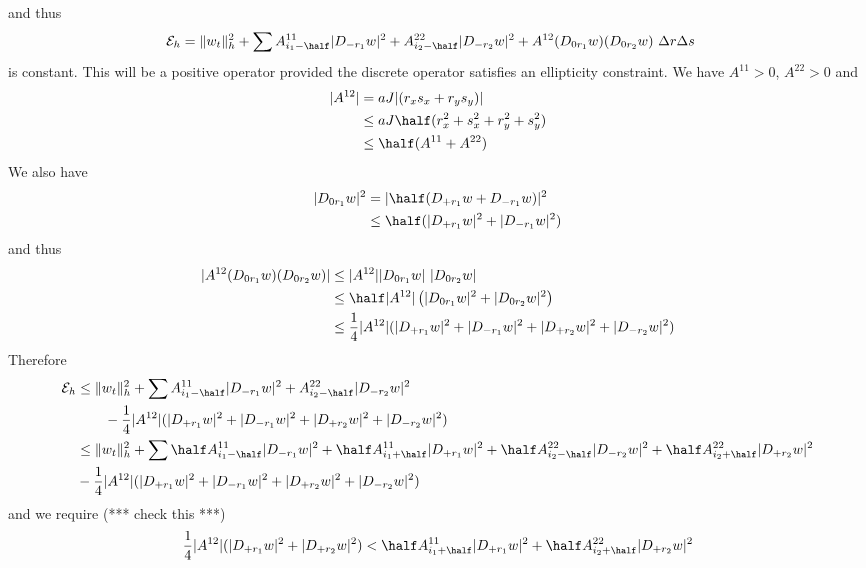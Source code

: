 \documentclass[10pt]{article}
\begin{document}
and thus
\begin{align*}
  {\cal E}_h &= \| w_t \|_h^2 + \sum A^{11}_{i_1-\half} |D_{- r_1} w|^2
                      +A^{22}_{i_2-\half} |D_{- r_2} w|^2
                      +A^{12} (D_{0 r_1} w)(D_{0 r_2} w) ~\Delta r \Delta s
\end{align*}
is constant. This will be a positive operator provided the discrete operator satisfies an ellipticity
constraint.
We have $A^{11}>0$, $A^{22}>0$ and
\begin{align*}
   | A^{12}| &= a J |(r_x s_x + r_y s_y)| \\
          &\le a J \half( r_x^2 + s_x^2 + r_y^2 + s_y^2 ) \\
          &\le \half( A^{11} + A^{22} )
\end{align*}
We also have
\begin{align*}
  | D_{0 r_1} w |^2 &= | \half( D_{+ r_1}w+ D_{- r_1}w) |^2 \\
                    &\le \half( |D_{+ r_1}w|^2 + |D_{- r_1}w |^2  )
\end{align*}
and thus
\begin{align*}
    | A^{12} (D_{0 r_1} w)(D_{0 r_2} w) | & \le | A^{12} | |D_{0 r_1} w| ~ |D_{0 r_2} w| \\
                         &\le {\half} | A^{12} |\left( |D_{0 r_1} w|^2 + |D_{0 r_2} w|^2 \right) \\
    &\le {1\over 4} |A^{12}|( |D_{+ r_1}w|^2 + |D_{- r_1}w |^2  + |D_{+ r_2}w|^2 + |D_{- r_2}w |^2 )
\end{align*}
Therefore
\begin{align*}
 {\cal E}_h &\le \| w_t \|_h^2 +\sum A^{11}_{i_1-\half} |D_{- r_1} w|^2
                +A^{22}_{i_2-\half} |D_{- r_2} w|^2  \\
      &~~~~~~          - {1\over 4} |A^{12}|( |D_{+ r_1}w|^2 + |D_{- r_1}w |^2 
   + |D_{+ r_2}w|^2 + |D_{- r_2}w |^2 )  \\
         &\le \| w_t \|_h^2 +\sum \half A^{11}_{i_1-\half} |D_{- r_1} w|^2 + \half A^{11}_{i_1+\half} |D_{+ r_1} w|^2
                +\half A^{22}_{i_2-\half} |D_{- r_2} w|^2+\half A^{22}_{i_2+\half} |D_{+ r_2} w|^2 \\
         &       - {1\over 4} |A^{12}|( |D_{+ r_1}w|^2 + |D_{- r_1}w |^2 
   + |D_{+ r_2}w|^2 + |D_{- r_2}w |^2 )  
\end{align*}
and we require (*** check this ***)
\[
   {1\over 4} |A^{12}| ( |D_{+ r_1}w|^2 + |D_{+ r_2}w|^2 ) < 
     \half A^{11}_{i_1+\half} |D_{+ r_1} w|^2 +\half A^{22}_{i_2+\half} |D_{+ r_2} w|^2
\]
\end{document}
